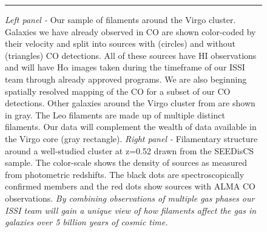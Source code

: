 \documentclass[11pt]{article}
\begin{document}
\begin{figure}[t!]
\caption{\small{{\it Left panel - } Our sample of filaments around the Virgo cluster.  Galaxies we have already observed in CO are shown color-coded by their velocity and split into sources with (circles) and without (triangles) CO detections.  All of these sources have HI observations and will have H$\alpha$ images taken during the timeframe of our ISSI team through already approved programs.  We are also beginning spatially resolved mapping of the CO for a subset of our CO detections.  Other galaxies around the Virgo cluster from \citet{Kim16} are shown in gray.   The Leo filaments are made up of multiple distinct filaments.  Our data will complement the wealth of data available in the Virgo core (gray rectangle). {\it Right panel - } Filamentary structure around a well-studied cluster at z=0.52 drawn from the SEEDisCS sample.  The color-scale shows the density of sources as measured from photometric redshifts.  The black dots are spectroscopically confirmed members and the red dots show sources with ALMA CO observations.  \textit{By combining observations of multiple gas phases our ISSI team will gain a unique view of how filaments affect the gas in galaxies over 5 billion years of cosmic time.}}}
\label{fig:Fig1}
\vspace{0.2cm}
\hrule
\vspace{-0.5cm}
\end{figure}


\end{document}
